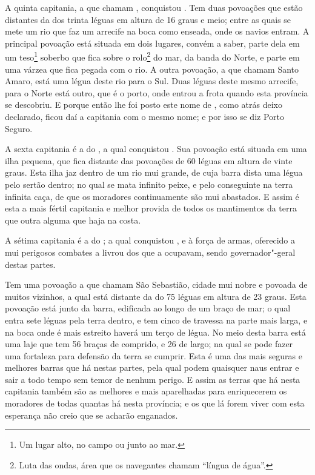 A quinta capitania, a que chamam , conquistou . Tem duas povoações que estão distantes da dos 
trinta léguas em altura de 16 graus e meio; entre as quais se
mete um rio que faz um arrecife na boca como enseada, onde os navios
entram. A principal povoação está situada em dois lugares, convém a
saber, parte dela em um teso\footnote{ Um lugar alto, no campo ou junto
ao mar.} soberbo que fica sobre o rolo\footnote{ Luta das ondas, área
que os navegantes chamam ``língua de água''.}
do mar, da banda do Norte, e parte em uma várzea que fica pegada com o
rio. A outra povoação, a que chamam Santo Amaro, está uma légua deste
rio para o Sul. Duas léguas deste mesmo arrecife, para o Norte está
outro, que é o porto, onde entrou a frota quando esta província se
descobriu. E porque então lhe foi posto este nome de , como
atrás deixo declarado, ficou daí a capitania com o mesmo nome; e por
isso se diz Porto Seguro.

A sexta capitania é a do , a qual conquistou . Sua povoação está situada em uma ilha pequena, que
fica distante das povoações de  60 léguas em altura
de vinte graus. Esta ilha jaz dentro de um rio mui grande, de cuja barra
dista uma légua pelo sertão dentro; no qual se mata infinito peixe, e
pelo conseguinte na terra infinita caça, de que os moradores
continuamente são mui abastados. E assim é esta a mais fértil capitania
e melhor provida de todos os mantimentos da terra que outra alguma que
haja na costa.

A sétima capitania é a do ; a qual conquistou ,		
e à força de armas, oferecido a mui perigosos combates a livrou dos
 que a ocupavam, sendo governador"-geral destas partes.			%

Tem uma povoação a que chamam São Sebastião, cidade mui nobre e povoada				%
de muitos vizinhos, a qual está distante da do  
75 léguas em altura de 23 graus. Esta povoação está junto
da barra, edificada ao longo de um braço de mar; o qual entra sete
léguas pela terra dentro, e tem cinco de travessa na parte mais larga,
e na boca onde é mais estreito haverá um terço de légua. No meio desta
barra está uma laje que tem 56 braças de comprido, e
26 de largo; na qual se pode fazer uma fortaleza para defensão
da terra se cumprir. Esta é uma das mais seguras e melhores barras que
há nestas partes, pela qual podem quaisquer naus entrar e sair a todo
tempo sem temor de nenhum perigo. E assim as terras que há nesta
capitania também são as melhores e mais aparelhadas para enriquecerem
os moradores de todas quantas há nesta província; e os que lá forem
viver com esta esperança não creio que se acharão enganados.

